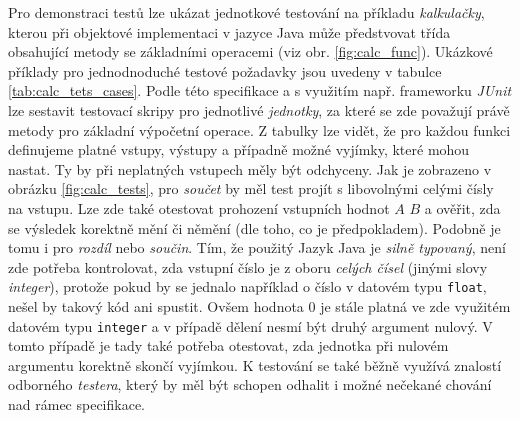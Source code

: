 \documentclass[czech, ma, kiv, he, iso690numb, pdf, viewonly]{fasthesis}
\begin{document}
    Pro demonstraci testů lze ukázat jednotkové testování na příkladu \textit{kalkulačky}, kterou při objektové implementaci v jazyce Java může předstvovat třída obsahující metody se základními operacemi (viz obr. \ref{fig:calc_func}). Ukázkové příklady pro jednodnoduché testové požadavky jsou uvedeny v tabulce \ref{tab:calc_tets_cases}. Podle této specifikace a s využitím např. frameworku \textit{JUnit} lze sestavit testovací skripy pro jednotlivé \emph{jednotky}, za které se zde považují právě metody pro základní výpočetní operace. Z tabulky lze vidět, že pro každou funkci definujeme platné vstupy, výstupy  a případně možné vyjímky, které mohou nastat. Ty by při neplatných vstupech měly být odchyceny. Jak je zobrazeno v obrázku \ref{fig:calc_tests}, pro \textit{součet} by měl test projít s libovolnými celými čísly na vstupu. Lze zde také otestovat prohození vstupních hodnot \(A\) \(B\) a ověřit, zda se výsledek korektně mění či němění (dle toho, co je předpokladem). Podobně je tomu i pro \textit{rozdíl} nebo \textit{součin}. Tím, že použitý Jazyk Java je \textit{silně typovaný}, není zde potřeba kontrolovat, zda vstupní číslo je z oboru \textit{celých čísel} (jinými slovy \textit{integer}), protože pokud by se jednalo například o číslo v datovém typu \verb|float|, nešel by takový kód ani spustit. Ovšem hodnota \(0\) je stále platná ve zde využitém datovém typu \verb|integer| a v případě dělení nesmí být druhý argument nulový. V tomto případě je tady také potřeba otestovat, zda jednotka při nulovém argumentu korektně skončí vyjímkou. K testování se také běžně využívá znalostí odborného \textit{testera}, který by měl být schopen odhalit i možné nečekané chování nad rámec specifikace.
\end{document}
